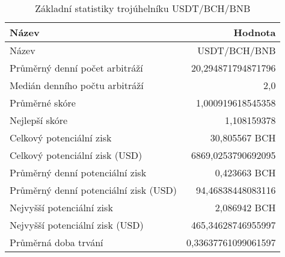 \begin{table}\centering
\caption{Základní statistiky trojúhelníku USDT/BCH/BNB}
\label{USDTBCHBNB_stats}
\begin{tabular}{|| l | r ||}
\hline Název & Hodnota \\ 
\hline\hline Název & USDT/BCH/BNB \\ 
\hline Průměrný denní počet arbitráží & 20,294871794871796 \\ 
\hline Medián denního počtu arbitráží & 2,0 \\ 
\hline Průměrné skóre & 1,000919618545358 \\ 
\hline Nejlepší skóre & 1,108159378 \\ 
\hline Celkový potenciální zisk & 30,805567 BCH \\ 
\hline Celkový potenciální zisk (USD) & 6869,0253790692095 \\ 
\hline Průměrný denní potenciální zisk & 0,423663 BCH \\ 
\hline Průměrný denní potenciální zisk (USD) & 94,46838448083116 \\ 
\hline Nejvyšší potenciální zisk & 2,086942 BCH \\ 
\hline Nejvyšší potenciální zisk (USD) & 465,34628746955997 \\ 
\hline Průměrná doba trvání & 0,33637761099061597 \\ 
\hline
\end{tabular}
\end{table}